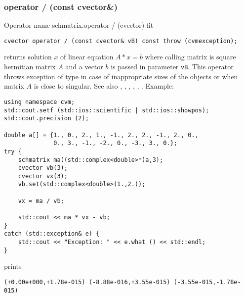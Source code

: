 \subsubsection{operator / (const cvector\&)}
Operator%
\pdfdest name {schmatrix.operator / (cvector)} fit
\begin{verbatim}
cvector operator / (const cvector& vB) const throw (cvmexception);
\end{verbatim}
returns solution $x$ of linear equation
$A*x=b$ where calling matrix is square hermitian matrix $A$
and a vector $b$ is passed in parameter \verb"vB".
This operator throws exception 
of type 
in case of inappropriate sizes
of the objects or when  matrix $A$ is close to singular.
See also , 
, 
, 
, , .
Example:
\begin{Verbatim}
using namespace cvm;
std::cout.setf (std::ios::scientific | std::ios::showpos);
std::cout.precision (2);

double a[] = {1., 0., 2., 1., -1., 2., 2., -1., 2., 0.,
              0., 3., -1., -2., 0., -3., 3., 0.};
try {
    schmatrix ma((std::complex<double>*)a,3);
    cvector vb(3);
    cvector vx(3);
    vb.set(std::complex<double>(1.,2.));

    vx = ma / vb;

    std::cout << ma * vx - vb;
}
catch (std::exception& e) {
    std::cout << "Exception: " << e.what () << std::endl;
}
\end{Verbatim}
prints
\begin{Verbatim}
(+0.00e+000,+1.78e-015) (-8.88e-016,+3.55e-015) (-3.55e-015,-1.78e-015)
\end{Verbatim}
\newpage



